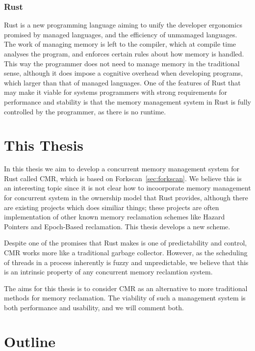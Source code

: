 \subsubsection{Rust}

Rust is a new programming language aiming to unify the developer ergonomics promised by managed
languages, and the efficiency of unmamaged languages. The work of managing memory is left to the
compiler, which at compile time analyses the program, and enforces certain rules about how memory
is handled. This way the programmer does not need to manage memory in the traditional sense,
although it does impose a cognitive overhead when developing programs, which larger than that of managed
languages. One of the features of Rust that may make it viable for systems programmers with strong
requirements for performance and stability is that the memory management system in Rust is fully
controlled by the programmer, as there is no runtime.


\section{This Thesis}

In this thesis we aim to develop a concurrent memory management system for Rust called CMR\@, which
is based on Forkscan~\ref{sec:forkscan}. We believe this is an interesting topic since it is not
clear how to incoorporate memory management for concurrent system in the ownership model that Rust
provides, although there are existing projects which does similiar things; these projects are often
implementation of other known memory reclamation schemes like Hazard Pointers and Epoch-Based
reclamation. This thesis develops a new scheme.

Despite one of the promises that Rust makes is one of predictability and control, CMR works more
like a traditional garbage collector. However, as the scheduling of threads in a process inherently
is fuzzy and unpredictable, we believe that this is an intrinsic property of any concurrent memory
reclamtion system.

The aims for this thesis is to consider CMR as an alternative to more traditional methods for
memory reclamation. The viability of such a management system is both performance and usability,
and we will comment both.


\section{Outline}


